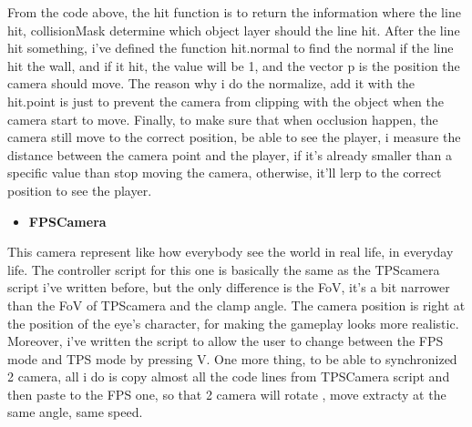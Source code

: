 \documentclass[a4paper, 13pt]{extarticle}
\begin{document}
From the code above, the hit function is to return the information where the line hit, collisionMask determine which object layer should the line hit. After the line hit something, i've defined the function hit.normal to find the normal if the line hit the wall, and if it hit, the value will be 1, and the vector p is the position the camera should move. The reason why i do the normalize, add it with the hit.point is just to prevent the camera from clipping with the object when the camera start to move. Finally, to make sure that when occlusion happen, the camera still move to the correct position, be able to see the player, i measure the distance between the camera point and the player, if it's already smaller than a specific value than stop moving the camera, otherwise, it'll lerp to the correct position to see the player.  
\begin{itemize}
	\item \bfseries FPSCamera 	 	
\end{itemize}
	This camera represent like how everybody see the world in real life, in everyday life. The controller script for this one is basically the same as the TPScamera script i've written before, but the only difference is the FoV, it's a bit narrower than the FoV of TPScamera and the clamp angle. The camera position is right at the position of the eye's character, for making the gameplay looks more realistic. Moreover, i've written the script to allow the user to change between the FPS mode and TPS mode by pressing V. One more thing, to be able to synchronized 2 camera, all i do is copy almost all the code lines from TPSCamera script and then paste to the FPS one, so that 2 camera will rotate , move extracty at the same angle, same speed. 
\end{document}
